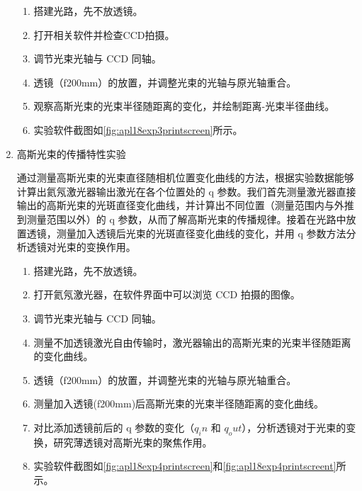 \begin{enumerate}
	\begin{enumerate}
		\item 搭建光路，先不放透镜。
		
		\item 打开相关软件并检查CCD拍摄。
		
		\item 调节光束光轴与 CCD 同轴。
		
		\item 透镜（f200mm）的放置，并调整光束的光轴与原光轴重合。
		
		\item 观察高斯光束的光束半径随距离的变化，并绘制距离-光束半径曲线。
		
		\item 实验软件截图如\cref{fig:apl18exp3printscreen}所示。
	\end{enumerate}
	
	\item 高斯光束的传播特性实验
	
	通过测量高斯光束的光束直径随相机位置变化曲线的方法，根据实验数据能够计算出氦氖激光器输出激光在各个位置处的 q 参数。我们首先测量激光器直接输出的高斯光束的光斑直径变化曲线，并计算出不同位置（测量范围内与外推到测量范围以外）的 q 参数，从而了解高斯光束的传播规律。接着在光路中放置透镜，测量加入透镜后光束的光斑直径变化曲线的变化，并用 q 参数方法分析透镜对光束的变换作用。
	\begin{enumerate}
		\item 搭建光路，先不放透镜。
		
		\item 打开氦氖激光器，在软件界面中可以浏览 CCD 拍摄的图像。
		
		\item 调节光束光轴与 CCD 同轴。
		
		\item 测量不加透镜激光自由传输时，激光器输出的高斯光束的光束半径随距离的变化曲线。
		
		\item 透镜（f200mm）的放置，并调整光束的光轴与原光轴重合。
		
		\item 测量加入透镜(f200mm)后高斯光束的光束半径随距离的变化曲线。
		
		\item 对比添加透镜前后的 q 参数的变化（$q_in$ 和 $q_out$），分析透镜对于光束的变换，研究薄透镜对高斯光束的聚焦作用。
		
		\item 实验软件截图如\cref{fig:apl18exp4printscreen}和\cref{fig:apl18exp4printscreent}所示。
	\end{enumerate}
\end{enumerate}	

